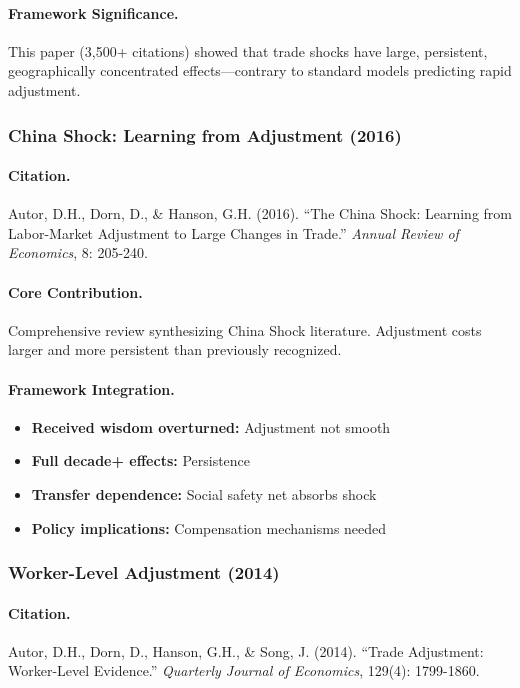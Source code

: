 \documentclass[12pt,a4paper]{article}
\begin{document}
\paragraph{Framework Significance.}
This paper (3,500+ citations) showed that trade shocks have large,
persistent, geographically concentrated effects---contrary to standard
models predicting rapid adjustment.

\subsubsection{China Shock: Learning from Adjustment (2016)}

\paragraph{Citation.}
Autor, D.H., Dorn, D., \& Hanson, G.H. (2016). ``The China Shock:
Learning from Labor-Market Adjustment to Large Changes in Trade.''
\emph{Annual Review of Economics}, 8: 205-240.

\paragraph{Core Contribution.}
Comprehensive review synthesizing China Shock literature. Adjustment
costs larger and more persistent than previously recognized.

\paragraph{Framework Integration.}
\begin{itemize}
  \item \textbf{Received wisdom overturned:} Adjustment not smooth
  \item \textbf{Full decade+ effects:} Persistence
  \item \textbf{Transfer dependence:} Social safety net absorbs shock
  \item \textbf{Policy implications:} Compensation mechanisms needed
\end{itemize}

\subsubsection{Worker-Level Adjustment (2014)}

\paragraph{Citation.}
Autor, D.H., Dorn, D., Hanson, G.H., \& Song, J. (2014). ``Trade
Adjustment: Worker-Level Evidence.''
\emph{Quarterly Journal of Economics}, 129(4): 1799-1860.
\end{document}
